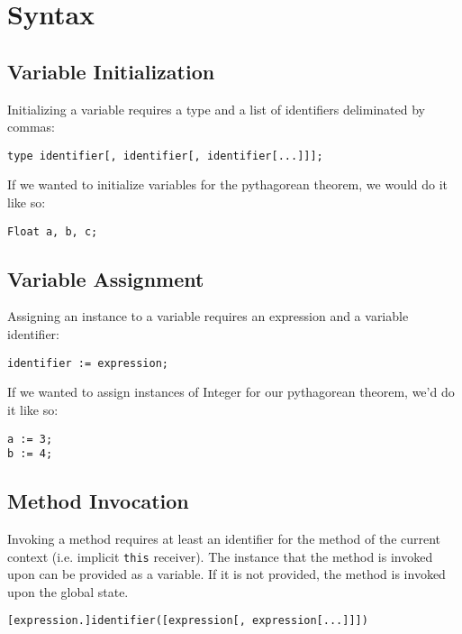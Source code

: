 \section{Syntax}
\subsection{Variable Initialization}
Initializing a variable requires a type and a list of identifiers deliminated by commas:

\begin{lstlisting}
type identifier[, identifier[, identifier[...]]];
\end{lstlisting}

If we wanted to initialize variables for the pythagorean theorem, we would do it like so:

\begin{lstlisting}[caption=Variable Initialization for the Pythagorean Theorem]
Float a, b, c;
\end{lstlisting}

\subsection{Variable Assignment}
Assigning an instance to a variable requires an expression and a variable identifier:

\begin{lstlisting}
identifier := expression;
\end{lstlisting}

If we wanted to assign instances of Integer for our pythagorean theorem, we'd do it like so:

\begin{lstlisting}[caption=Variable Assignment for the Pythagorean Theorem]
a := 3;
b := 4;
\end{lstlisting}

\subsection{Method Invocation}
Invoking a method requires at least an identifier for the method of the current context (i.e. implicit \verb!this! receiver). The instance that the method is invoked upon can be provided as a variable. If it is not provided, the method is invoked upon the global state.

\begin{lstlisting}
[expression.]identifier([expression[, expression[...]]])
\end{lstlisting}

